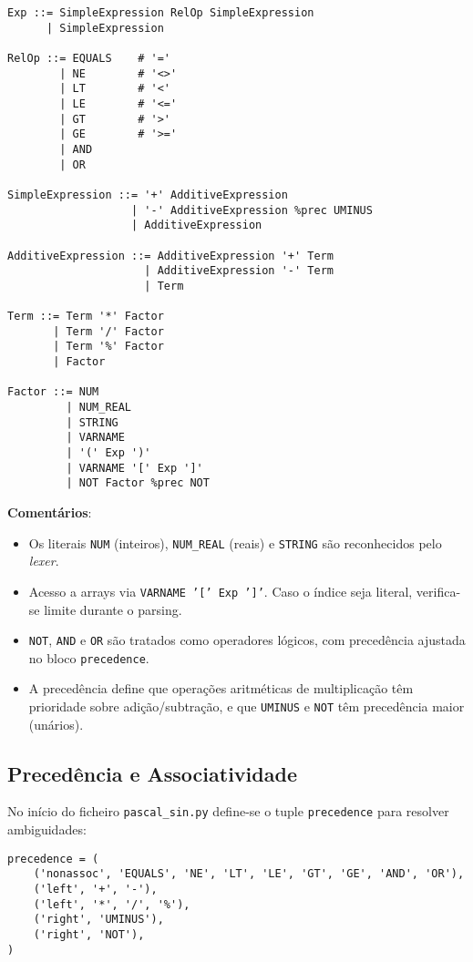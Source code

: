 \begin{verbatim}
Exp ::= SimpleExpression RelOp SimpleExpression
      | SimpleExpression

RelOp ::= EQUALS    # '='
        | NE        # '<>'
        | LT        # '<'
        | LE        # '<='
        | GT        # '>'
        | GE        # '>='
        | AND
        | OR

SimpleExpression ::= '+' AdditiveExpression
                   | '-' AdditiveExpression %prec UMINUS
                   | AdditiveExpression

AdditiveExpression ::= AdditiveExpression '+' Term
                     | AdditiveExpression '-' Term
                     | Term

Term ::= Term '*' Factor
       | Term '/' Factor
       | Term '%' Factor
       | Factor

Factor ::= NUM
         | NUM_REAL
         | STRING
         | VARNAME
         | '(' Exp ')'
         | VARNAME '[' Exp ']'
         | NOT Factor %prec NOT
\end{verbatim}

\noindent

\textbf{Comentários}:
\begin{itemize}
    \item Os literais \texttt{NUM} (inteiros), \texttt{NUM\_REAL} (reais) e \texttt{STRING} são reconhecidos pelo \emph{lexer}.
    \item Acesso a arrays via \texttt{VARNAME '[' Exp ']'}. Caso o índice seja literal, verifica-se limite durante o parsing.
    \item \texttt{NOT}, \texttt{AND} e \texttt{OR} são tratados como operadores lógicos, com precedência ajustada no bloco \texttt{precedence}.
    \item A precedência define que operações aritméticas de multiplicação têm prioridade sobre adição/subtração, e que \texttt{UMINUS} e \texttt{NOT} têm precedência maior (unários).
\end{itemize}

\subsection{Precedência e Associatividade}

No início do ficheiro \texttt{pascal\_sin.py} define-se o tuple \texttt{precedence} para resolver ambiguidades:

\begin{verbatim}
precedence = (
    ('nonassoc', 'EQUALS', 'NE', 'LT', 'LE', 'GT', 'GE', 'AND', 'OR'),
    ('left', '+', '-'),
    ('left', '*', '/', '%'),
    ('right', 'UMINUS'),
    ('right', 'NOT'),
)
\end{verbatim}

